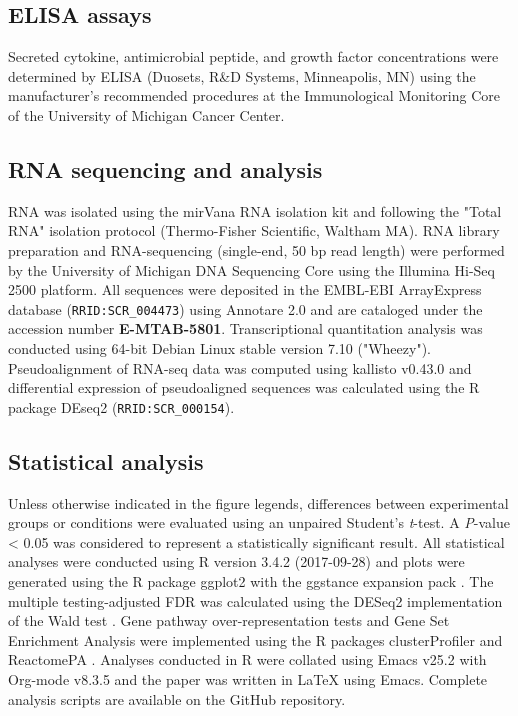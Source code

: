 \documentclass[9pt,lineo]{elife}
\begin{document}
\subsection*{{\bfseries\sffamily } ELISA assays}
\label{sec:orgheadline24}
Secreted cytokine, antimicrobial peptide, and growth factor concentrations were determined by ELISA (Duosets, R\&D Systems, Minneapolis, MN) using the manufacturer's recommended procedures at the Immunological Monitoring Core of the University of Michigan Cancer Center.
\subsection*{{\bfseries\sffamily } RNA sequencing and analysis}
\label{sec:orgheadline25}
RNA was isolated using the mirVana RNA isolation kit and following the "Total RNA" isolation protocol (Thermo-Fisher Scientific, Waltham MA). RNA library preparation and RNA-sequencing (single-end, 50 bp read length) were performed by the University of Michigan DNA Sequencing Core using the Illumina Hi-Seq 2500 platform. All sequences were deposited in the EMBL-EBI ArrayExpress database (\texttt{RRID:SCR\_004473}) using Annotare 2.0 and are cataloged under the accession number \textbf{E-MTAB-5801}. Transcriptional quantitation analysis was conducted using 64-bit Debian Linux stable version 7.10 ("Wheezy"). Pseudoalignment of RNA-seq data was computed using kallisto v0.43.0 \citep{Bray:2016} and differential expression of pseudoaligned sequences was calculated using the R package DEseq2 \citep{Love:2014} (\texttt{RRID:SCR\_000154}). 
\subsection*{{\bfseries\sffamily } Statistical analysis}
\label{sec:orgheadline26}
Unless otherwise indicated in the figure legends, differences between experimental groups or conditions were evaluated using an unpaired Student's \emph{t}-test. A \emph{P}-value < 0.05 was considered to represent a statistically significant result. All statistical analyses were conducted using R version 3.4.2 (2017-09-28) \citep{CRAN:2017} and plots were generated using the R package ggplot2 \citep{Wickham:2009} with the ggstance expansion pack \cite{Henry:2016}. The multiple testing-adjusted FDR was calculated using the DESeq2 implementation of the Wald test \citep{Love:2014}. Gene pathway over-representation tests and Gene Set Enrichment Analysis \citep{Subramanian:2005} were implemented using the R packages clusterProfiler \citep{Yu:2012} and ReactomePA \citep{Yu:2016}. Analyses conducted in R were collated using Emacs v25.2 \citep{Stallman:1981:EEC:1159890.806466} with Org-mode v8.3.5 and the paper was written in \LaTeX{} using Emacs. Complete analysis scripts are available on the \cite{Hill:gita} GitHub repository.
\end{document}
